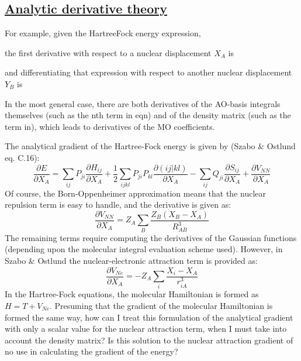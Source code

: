 \documentclass[%
class = book,%
crop = false,%
float = true,%
multi = true,%
preview = false,%
]{standalone}
\newcommand\hf{Hartree\textendash{}Fock\xspace}%
\begin{document}
\subsection{\texorpdfstring{\href{https://chemistry.stackexchange.com/q/89831/194}{Analytic derivative theory}}{Analytic derivative theory}}
\label{ssec:analytic-derivative-theory}

For example, given the \hf energy expression,

the first derivative with respect to a nuclear displacement \(X_{A}\) is

and differentiating that expression with respect to another nuclear displacement \(Y_{B}\) is

In the most general case, there are both derivatives of the AO-basis integrals themselves (such as the nth term in eqn) and of the density matrix (such as the term in), which leads to derivatives of the MO coefficients.

The analytical gradient of the Hartree-Fock energy is given by (Szabo \& Ostlund eq. C.16):
\begin{equation}
  \frac{\partial E}{\partial X_{A}} = \sum_{ij}{P_{ji} \frac{\partial H_{ij}}{\partial X_{A}}} + \frac{1}{2} \sum_{ijkl}{P_{ji}P_{kl} \frac{\partial (ij|kl)}{\partial X_{A}}} - \sum_{ij}{Q_{ji} \frac{\partial S_{ij}}{\partial X_{A}}} + \frac{\partial V_{NN}}{\partial X_{A}}
\end{equation}
Of course, the Born-Oppenheimer approximation means that the nuclear repulsion term is easy to handle, and the derivative is given as:
\begin{equation}
  \frac{\partial V_{NN}}{\partial X_{A}} = Z_{A} \sum_{B} \frac{Z_{B} (X_{B} - X_{A})}{R_{AB}^{3}}
\end{equation}
The remaining terms require computing the derivatives of the Gaussian functions (depending upon the molecular integral evaluation scheme used). However, in Szabo \& Ostlund the nuclear-electronic attraction term is provided as:
\begin{equation}
  \frac{\partial V_{Ne}}{\partial X_{A}} = -Z_{A} \sum_{i} \frac{X_{i} - X_{A}}{r_{iA}^{3}}
\end{equation}
In the Hartree-Fock equations, the molecular Hamiltonian is formed as \(H = T + V_{Ne}\). Presuming that the gradient of the molecular Hamiltonian is formed the same way, how can I treat this formulation of the analytical gradient with only a scalar value for the nuclear attraction term, when I must take into account the density matrix? Is this solution to the nuclear attraction gradient of no use in calculating the gradient of the energy?
\end{document}
